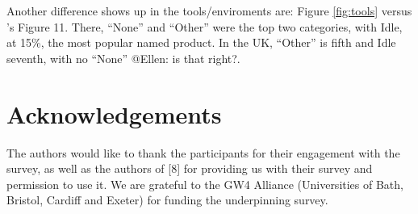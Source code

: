 \documentclass{sig-alternate}
\begin{document}
Another difference shows up in the tools/enviroments are: Figure \ref{fig:tools} versus \cite{mason+cooper:2014}'s Figure 11. There, ``None'' and ``Other'' were the top two categories, with Idle, at 15\%, the most popular named product. In the UK, ``Other'' is fifth and Idle seventh, with no ``None'' @Ellen: is that right?.


\section{Acknowledgements}

The authors would like to thank the participants for their engagement
with the survey, as well as the authors of [8] for providing us with their survey and permission to use it.
We are grateful to the GW4 Alliance (Universities of Bath, Bristol, Cardiff and Exeter) for funding the underpinning survey.


\end{document}
